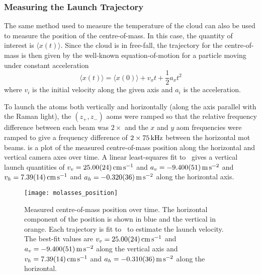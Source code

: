 \subsubsection{Measuring the Launch Trajectory}
The same method used to measure the temperature of the cloud can also
be used to measure the position of the centre-of-mass. In this case,
the quantity of interest is \(\langle x(t)\rangle\). Since the cloud
is in free-fall, the trajectory for the centre-of-mass is then given
by the well-known equation-of-motion for a particle moving under
constant acceleration
\begin{equation}
    \langle x(t) \rangle = \langle x(0) \rangle + v_x t + \frac{1}{2} a_x t^2
    \label{eq:position_free}
\end{equation}
where \(v_i\) is the initial velocity along the given axis and \(a_i\)
is the acceleration.
\par\noindent
To launch the atoms both vertically and horizontally (along the axis
parallel with the Raman light), the \((z_+, z_-)\) \acp{aom} were
ramped so that the relative frequency difference between each beam was
\(2\times\) and the \(x\) and \(y\) \ac{aom}
frequencies were ramped to give a frequency difference of \(2\times
\sivalue{75}{\kilo\hertz}\) between the horizontal \ac{mot} beams.
 is a plot of the measured
centre-of-mass position along the horizontal and vertical camera axes
over time. A linear least-squares fit
to~ gives a vertical launch quantities
of \(v_v = \sivalue{25.0\pm0.24}{\centi\meter\per\second}\) and \(a_v
= \sivalue{-9.40\pm0.051}{\metre\per\second\squared}\) and \(v_h =
\sivalue{7.39\pm0.14}{\centi\meter\per\second}\) and \(a_h =
\sivalue{-0.32\pm0.036}{\metre\per\second\squared}\) along the
horizontal axis. 
\begin{figure}[!htbp]
    \centering
    \texttt{[image: molasses\_position]}
    \caption[Atom cloud centre-of-mass over time]{Measured
    centre-of-mass position over time. The horizontal component of the
  position is shown in blue and the vertical in orange. Each
trajectory is fit to~ to estimate the
launch velocity. The best-fit values are \(v_v =
\sivalue{25.0\pm0.24}{\centi\meter\per\second}\) and \(a_v =
\sivalue{-9.40\pm0.051}{\metre\per\second\squared}\) along the
vertical axis and \(v_h =
\sivalue{7.39\pm0.14}{\centi\meter\per\second}\) and \(a_h =
\sivalue{-0.31\pm0.036}{\metre\per\second\squared}\) along the
horizontal.}
    \label{fig:molasses_position}
\end{figure}
